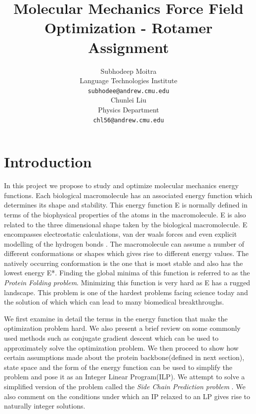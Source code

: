 \documentclass{article} %
\title{Molecular Mechanics Force Field Optimization - Rotamer Assignment}
\author{
Subhodeep Moitra\\
Language Technologies Institute\\
\texttt{subhodee@andrew.cmu.edu} \\
\And
Chunlei Liu \\
Physics Department \\
\texttt{chl56@andrew.cmu.edu} 
}
\begin{document}
\maketitle

\section{Introduction}
In this project we propose to study and optimize molecular mechanics energy functions. Each biological macromolecule has an associated energy function which determines its shape and stability. This energy function E is normally defined in terms of the biophysical properties of the atoms in the macromolecule. E is also related to the three dimensional shape taken by the biological macromolecule. E encompasses electrostatic calculations, van der waals forces and even explicit modelling of the hydrogen bonds \cite{Boas2007}. The macromolecule can assume a number of different conformations or shapes which gives rise to different energy values. The natively occurring conformation is the one that is most stable and also has the lowest energy E*. Finding the global minima of this function is referred to as the \emph{Protein Folding problem}. Minimizing this function is very hard as E has a rugged landscape. This problem is one of the hardest problems facing science today and the solution of which which can lead to many biomedical breakthroughs. 

We first examine in detail the terms in the energy function that make the optimization problem hard. We also present a brief review on some commonly used methods such as conjugate gradient descent which can be used to approximately solve the optimization problem. We  then proceed to show how certain assumptions made about the protein backbone(defined in next section), state space and the form of the energy function can be used to simplify the problem and pose it as an Integer Linear Program(ILP). We attempt to solve a simplified version of the problem called the \emph{Side Chain Prediction problem} \cite{scp}. We also comment on the conditions under which an IP relaxed to an  LP gives rise to naturally integer solutions. 
\end{document}
